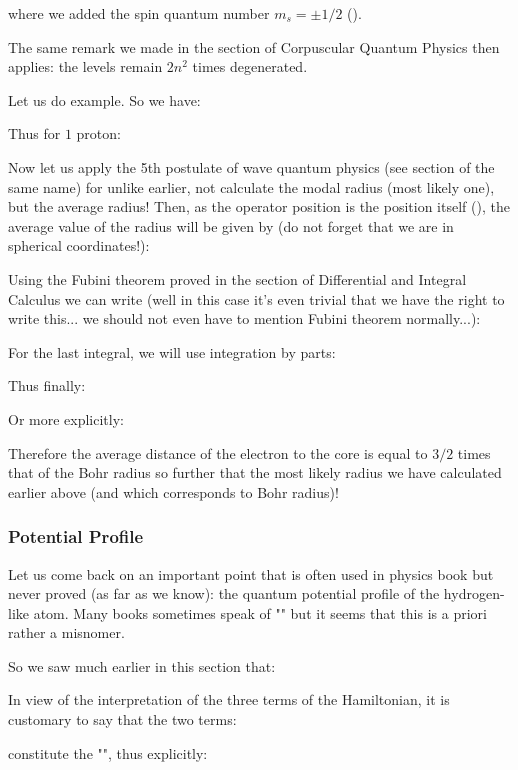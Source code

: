 	where we added the spin quantum number $m_s=\pm 1/2$ ().

	The same remark we made in the section of Corpuscular Quantum Physics then applies: the levels remain $2n^2$ times degenerated.

	Let us do example. So we have:
	
	Thus for $1$ proton:
	
	Now let us apply the 5th postulate of wave quantum physics (see section of the same name) for unlike earlier, not calculate the modal radius (most likely one), but the average radius! Then, as the operator position is the position itself (), the average value of the radius will be given by (do not forget that we are in spherical coordinates!):
	
	Using the Fubini theorem proved in the section of Differential and Integral Calculus we can write (well in this case it's even trivial that we have the right to write this... we should not even have to mention Fubini theorem normally...):
	
	For the last integral, we will use integration by parts:
	
	Thus finally:
	
	Or more explicitly:
	
	Therefore the average distance of the electron to the core is equal to $3/2$ times that of the Bohr radius so further that the most likely radius we have calculated earlier above (and which corresponds to Bohr radius)!
	
	\subsubsection{Potential Profile}
	Let us come back on an important point that is often used in physics book but never proved (as far as we know): the quantum potential profile of the hydrogen-like atom. Many books sometimes speak of "" but it seems that this is a priori rather a misnomer.

	So we saw much earlier in this section that:
	
	In view of the interpretation of the three terms of the Hamiltonian, it is customary to say that the two terms:
	
	constitute the "", thus explicitly:
	
